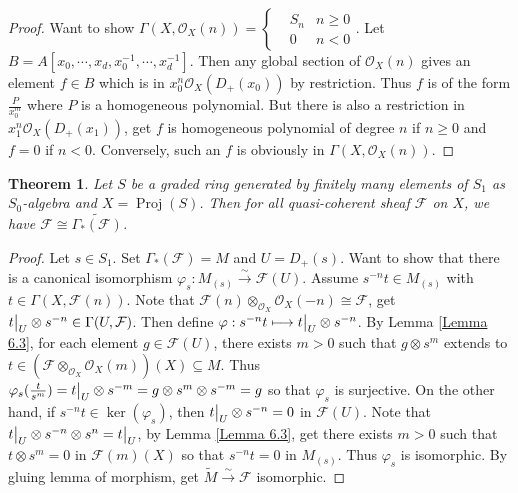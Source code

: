 \documentclass{ctexart}
\newtheorem{theorem}{Theorem}[section]
\newcommand{\proj}{\operatorname{Proj}}
\begin{document}
\begin{proof}
    Want to show $\Gamma(X, \mathcal{O}_{X}(n)) = 
    \left\{
        \begin{aligned}
            & S_{n} & n \ge 0 \\
            & 0 & n < 0
        \end{aligned}
    \right.
    $.
    Let $B = A[x_{0}, \cdots, x_{d}, x_{0}^{-1}, \cdots, x_{d}^{-1}]$.
    Then any global section  of $\mathcal{O}_{X}(n)$ gives an element $f\in B$ which is in $x_{0}^{n}\mathcal{O}_{X}(D_{+}(x_{0}))$ by restriction.
    Thus $f$ is of the form $\frac{P}{x_{0}^{m}}$ where $P$ is a homogeneous polynomial.
    But there is also a restriction in $x_{1}^{n}\mathcal{O}_{X}(D_{+}(x_{1}))$, get $f$ is homogeneous polynomial of degree $n$ if $n \ge 0$ and $f = 0$ if $n < 0$.
    Conversely, such an $f$ is obviously in $\Gamma(X, \mathcal{O}_{X}(n))$.
\end{proof}
\begin{theorem}
    Let $S$ be a graded ring generated by finitely many elements of $S_{1}$ as $S_{0}$-algebra and $X = \proj(S)$.
    Then for all quasi-coherent sheaf $\mathcal{F}$ on $X$, we have $\mathcal{F} \cong \widetilde{\Gamma_{\ast}(\mathcal{F})}$.
    \label{Theorem 6.4}
\end{theorem}
\begin{proof}
    Let $s\in S_{1}$.
    Set $\Gamma_{\ast}(\mathcal{F}) = M$ and $U = D_{+}(s)$.
    Want to show that there is a canonical isomorphism $\varphi_{s}: M_{(s)} \overset{\sim}{\longrightarrow} \mathcal{F}(U)$.
    Assume $s^{-n}t\in M_{(s)}$ with $t\in \Gamma(X, \mathcal{F}(n))$.
    Note that $\mathcal{F}(n) \otimes_{\mathcal{O}_{X}} \mathcal{O}_{X}(-n) \cong \mathcal{F}$, get $t\big{|}_{U} \otimes s^{-n}\in \Gamma(U, \mathcal{F})$.
    Then define $\varphi: s^{-n}t \longmapsto t\big{|}_{U} \otimes s^{-n}$.
    By Lemma \ref{Lemma 6.3}, for each element $g\in \mathcal{F}(U)$, there exists $m > 0$ such that $g \otimes s^{m}$ extends to $t\in (\mathcal{F} \otimes_{\mathcal{O}_{X}} \mathcal{O}_{X}(m))(X) \subseteq M$.
    Thus $\varphi_{s}(\frac{t}{s^{m}}) = t\big{|}_{U} \otimes s^{-m} = g \otimes s^{m} \otimes s^{-m} = g$ so that $\varphi_{s}$ is surjective.
    On the other hand, if $s^{-n}t\in \ker(\varphi_{s})$, then $t\big{|}_{U} \otimes s^{-n} = 0$ in $\mathcal{F}(U)$.
    Note that $t\big{|}_{U} \otimes s^{-n} \otimes s^{n} = t\big{|}_{U}$, by Lemma \ref{Lemma 6.3}, get there exists $m > 0$ such that $t \otimes s^{m} = 0$ in $\mathcal{F}(m)(X)$ so that $s^{-n}t = 0$ in $M_{(s)}$.
    Thus $\varphi_{s}$ is isomorphic.
    By gluing lemma of morphism, get $\widetilde{M} \overset{\sim}{\longrightarrow} \mathcal{F}$ isomorphic.
\end{proof}
\end{document}
